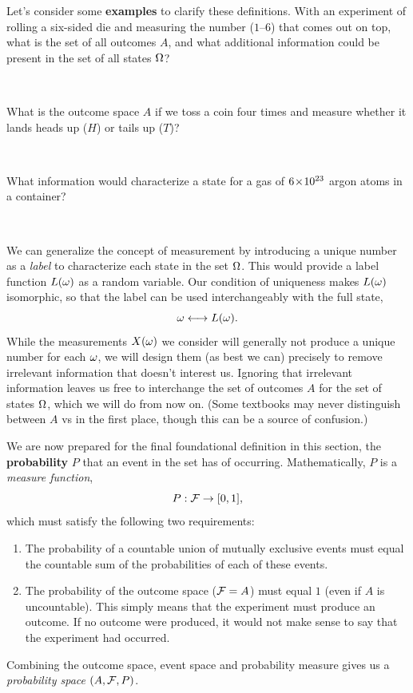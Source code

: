 Let's consider some \textbf{examples} to clarify these definitions.
With an experiment of rolling a six-sided die and measuring the number ($1$--$6$) that comes out on top, what is the set of all outcomes $A$, and what additional information could be present in the set of all states $\Omega$?
\begin{mdframed}
  \ \\[100 pt]
\end{mdframed}
What is the outcome space $A$ if we toss a coin four times and measure whether it lands heads up ($H$) or tails up ($T$)?
\begin{mdframed}
  \ \\[100 pt]
\end{mdframed}
\newpage %
\noindent What information would characterize a state \om for a gas of $6\!\times\! 10^{23}$ argon atoms in a container?
\begin{mdframed}
  \ \\[100 pt]
\end{mdframed}

We can generalize the concept of measurement by introducing a unique number as a \textit{label} to characterize each state \om in the set $\Omega$.
This would provide a label function $L(\omega)$ as a random variable.
Our condition of uniqueness makes $L(\omega)$ isomorphic, so that the label can be used interchangeably with the full state,
\begin{equation*}
  \omega \longleftrightarrow L(\omega).
\end{equation*}
While the measurements $X(\omega)$ we consider will generally not produce a unique number for each $\omega$, we will design them (as best we can) precisely to remove irrelevant information that doesn't interest us.
Ignoring that irrelevant information leaves us free to interchange the set of outcomes $A$ for the set of states $\Omega$, which we will do from now on.
(Some textbooks may never distinguish between $A$ vs \Om in the first place, though this can be a source of confusion.)

We are now prepared for the final foundational definition in this section, the \textbf{probability} $P$ that an event in the set \cF has of occurring.
Mathematically, $P$ is a \textit{measure function},
\begin{equation*}
  P: \mathcal F \to [0, 1],
\end{equation*}
which must satisfy the following two requirements: \\[-24 pt]
\begin{enumerate}
  \item The probability of a countable union of mutually exclusive events must equal the countable sum of the probabilities of each of these events.
  \item The probability of the outcome space ($\mathcal F = A$) must equal $1$ (even if $A$ is uncountable).
        This simply means that the experiment \cE must produce an outcome.
        If no outcome were produced, it would not make sense to say that the experiment had occurred.
\end{enumerate}
Combining the outcome space, event space and probability measure gives us a \textit{probability space} $(A, \mathcal F, P)$.

